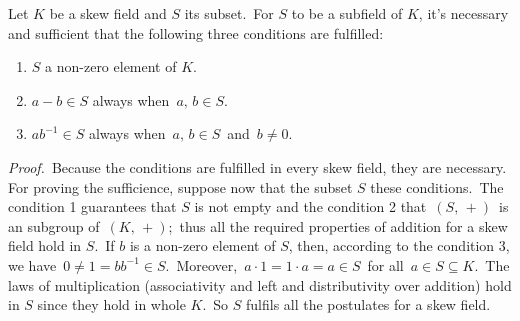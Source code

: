 \documentclass[12pt]{article}
\theoremstyle{definition}
\begin{document}
Let $K$ be a skew field and $S$ its subset.\, For $S$ to be a subfield of $K$, it's necessary and sufficient that the following three conditions are fulfilled:
\begin{enumerate}
\item $S$  a non-zero element of $K$.
\item $a\!-\!b \in S$ always when\, $a,\,b \in S$.
\item $ab^{-1} \in S$ always when\, $a,\,b \in S$\, and\, $b \neq 0$.
\end{enumerate}

{\em Proof.}\, Because the conditions are fulfilled in every skew field, they are necessary.\, For proving the sufficience, suppose now that the subset $S$  these conditions.\, The condition 1 guarantees that $S$ is not empty and the condition 2 that\, $(S,\, +)$\, is an subgroup of\, $(K,\, +)$;\, thus all the required properties of addition for a skew field hold in $S$.\, If $b$ is a non-zero element of $S$, then, according to the condition 3, we have\, $0 \neq 1 = bb^{-1} \in S$.\, Moreover,\, $a\!\cdot\!1 = 1\!\cdot a = a \in S$\, for all\, $a \in S \subseteq K$.\, The laws of multiplication (associativity and left and  distributivity over addition) hold in $S$ since they hold in whole $K$.\, So $S$ fulfils all the postulates for a skew field.
\end{document}
